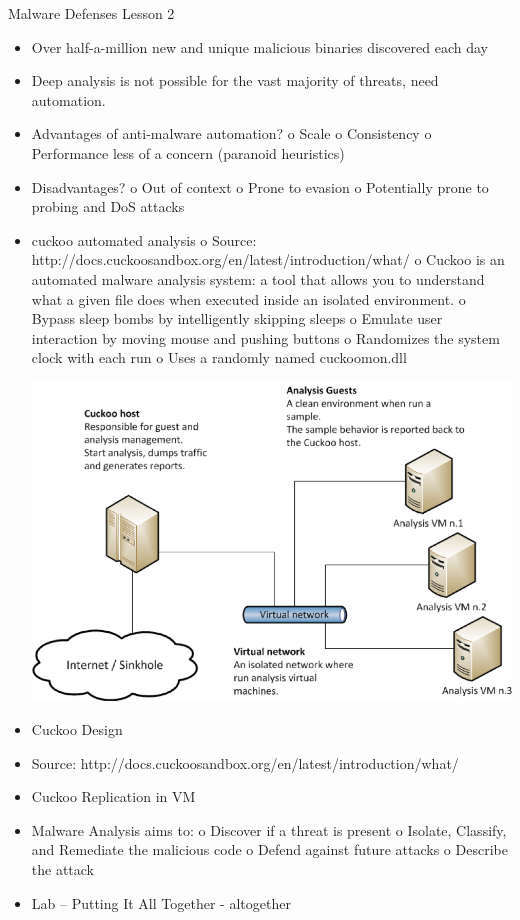 \documentclass[12pt]{article}
\begin{document}
\newline
Malware Defenses Lesson 2
\begin{itemize}
\item	Over half-a-million new and unique malicious binaries discovered each day
\item	Deep analysis is not possible for the vast majority of threats, need automation.
\item	Advantages of anti-malware automation?
o	Scale
o	Consistency
o	Performance less of a concern (paranoid heuristics)
\item	Disadvantages?
o	Out of context
o	Prone to evasion
o	Potentially prone to probing and DoS attacks
\item	cuckoo automated analysis
o	Source: http://docs.cuckoosandbox.org/en/latest/introduction/what/
o	Cuckoo is an automated malware analysis system: a tool that allows you to understand what a given file does when executed inside an isolated environment.
o	Bypass sleep bombs by intelligently skipping sleeps
o	Emulate user interaction by moving mouse and pushing buttons
o	Randomizes the system clock with each run
o	Uses a randomly named cuckoomon.dll

\includegraphics{Picture2.png}

\item	Cuckoo Design
\item	Source: http://docs.cuckoosandbox.org/en/latest/introduction/what/
\item	Cuckoo Replication in VM
\item	Malware Analysis aims to:
o	Discover if a threat is present
o	Isolate, Classify, and Remediate the malicious code
o	Defend against future attacks
o	Describe the attack
\item	Lab – Putting It All Together - altogether

\end{itemize}

 
\end{document}
